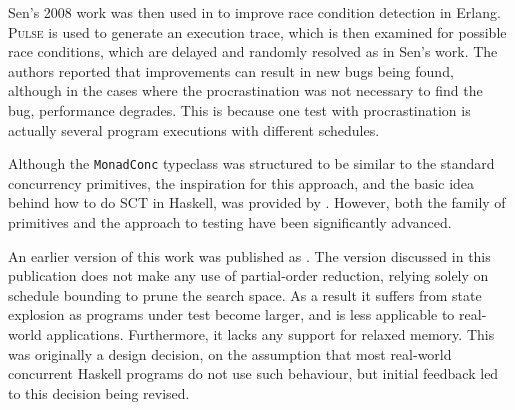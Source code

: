 Sen's 2008 work was then used in \citep{procrastination} to improve
race condition detection in Erlang. \textsc{Pulse} is used to generate
an execution trace, which is then examined for possible race
conditions, which are delayed and randomly resolved as in Sen's
work. The authors reported that improvements can result in new bugs
being found, although in the cases where the procrastination was not
necessary to find the bug, performance degrades. This is because one
test with procrastination is actually several program executions with
different schedules.






Although the \verb|MonadConc| typeclass was structured to be similar
to the standard concurrency primitives, the inspiration for this
approach, and the basic idea behind how to do SCT in Haskell, was
provided by \citep{typeclass}. However, both the family of primitives
and the approach to testing have been significantly advanced.


An earlier version of this work was published as \citep{dejafu}. The
version discussed in this publication does not make any use of
partial-order reduction, relying solely on schedule bounding to prune
the search space. As a result it suffers from state explosion as
programs under test become larger, and is less applicable to
real-world applications. Furthermore, it lacks any support for relaxed
memory. This was originally a design decision, on the assumption that
most real-world concurrent Haskell programs do not use such behaviour,
but initial feedback led to this decision being revised.

